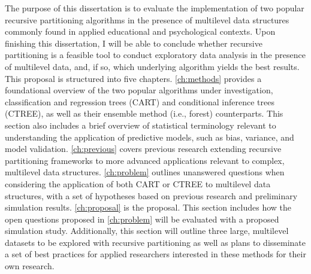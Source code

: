 The purpose of this dissertation is to evaluate the implementation of two popular recursive partitioning algorithms in the presence of multilevel data structures commonly found in applied educational and psychological contexts. Upon finishing this dissertation, I will be able to conclude whether recursive partitioning is a feasible tool to conduct exploratory data analysis in the presence of multilevel data, and, if so, which underlying algorithm yields the best results. This proposal is structured into five chapters. \autoref{ch:methods} provides a foundational overview of the two popular algorithms under investigation, classification and regression trees (CART) and conditional inference trees (CTREE), as well as their ensemble method (i.e., forest) counterparts. This section also includes a brief overview of statistical terminology relevant to understanding the application of predictive models, such as bias, variance, and model validation. \autoref{ch:previous} covers previous research extending recursive partitioning frameworks to more advanced applications relevant to complex, multilevel data structures. \autoref{ch:problem} outlines unanswered questions when considering the application of both CART or CTREE to multilevel data structures, with a set of hypotheses based on previous research and preliminary simulation results. \autoref{ch:proposal} is the proposal. This section includes how the open questions proposed in \autoref{ch:problem} will be evaluated with a proposed simulation study. Additionally, this section will outline three large, multilevel datasets to be explored with recursive partitioning as well as plans to disseminate a set of best practices for applied researchers interested in these methods for their own research.

